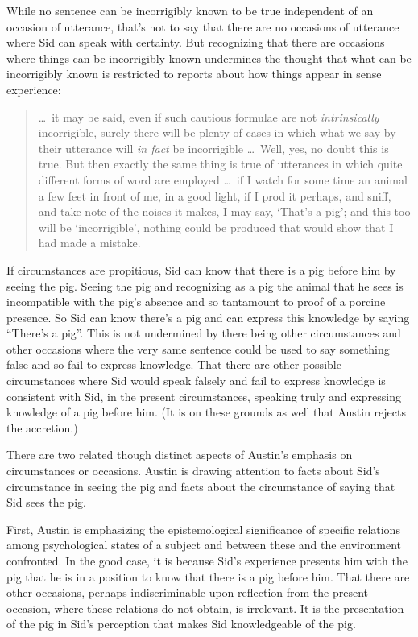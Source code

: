 \documentclass[11pt]{article}
\begin{document}
While no sentence can be incorrigibly known to be true independent of an occasion of utterance, that's not to say that there are no occasions of utterance where Sid can speak with certainty. But recognizing that there are occasions where things can be incorrigibly known undermines the thought that what can be incorrigibly known is restricted to reports about how things appear in sense experience:
\begin{quote}
    \ldots\ it may be said, even if such cautious formulae are not \emph{intrinsically} incorrigible, surely there will be plenty of cases in which what we say by their utterance will \emph{in fact} be incorrigible \ldots\ Well, yes, no doubt this is true. But then exactly the same thing is true of utterances in which quite different forms of word are employed \ldots\ if I watch for some time an animal a few feet in front of me, in a good light, if I prod it perhaps, and sniff, and take note of the noises it makes, I may say, `That’s a pig’; and this too will be `incorrigible’, nothing could be produced that would show that I had made a mistake. \citep[114--5]{Austin:1962lr}
\end{quote}
If circumstances are propitious, Sid can know that there is a pig before him by seeing the pig. Seeing the pig and recognizing as a pig the animal that he sees is incompatible with the pig's absence and so tantamount to proof of a porcine presence. So Sid can know there's a pig and can express this knowledge by saying ``There's a pig''. This is not undermined by there being other circumstances and other occasions where the very same sentence could be used to say something false and so fail to express knowledge. That there are other possible circumstances where Sid would speak falsely and fail to express knowledge is consistent with Sid, in the present circumstances, speaking truly and expressing knowledge of a pig before him. (It is on these grounds as well that Austin rejects the accretion.)

There are two related though distinct aspects of Austin's emphasis on circumstances or occasions. Austin is drawing attention to facts about Sid's circumstance in seeing the pig and facts about the circumstance of saying that Sid sees the pig.

First, Austin is emphasizing the epistemological significance of specific relations among psychological states of a subject and between these and the environment confronted. In the good case, it is because Sid's experience presents him with the pig that he is in a position to know that there is a pig before him. That there are other occasions, perhaps indiscriminable upon reflection from the present occasion, where these relations do not obtain, is irrelevant. It is the presentation of the pig in Sid's perception that makes Sid knowledgeable of the pig. 
\end{document}
